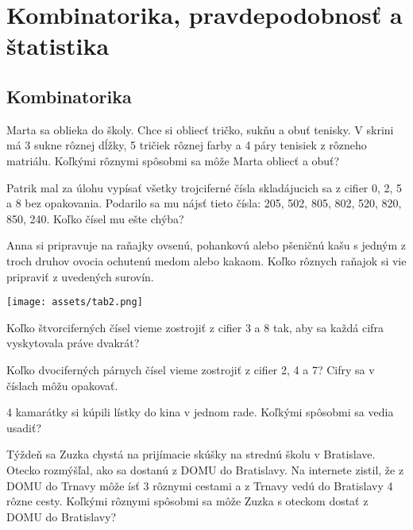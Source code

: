 \chapter{Kombinatorika, pravdepodobnosť a štatistika}

\section{Kombinatorika}

\begin{example}
	Marta sa oblieka do školy. Chce si obliecť tričko, sukňu a obuť tenisky. V skrini má 3 sukne rôznej dĺžky, 5 tričiek rôznej farby a 4 páry tenisiek z rôzneho matriálu. Koľkými rôznymi spôsobmi sa môže Marta obliecť a obuť? 
\end{example}

\begin{example}
	Patrik mal za úlohu vypísať všetky trojciferné čísla skladájucich sa z cifier 0, 2, 5 a 8 bez opakovania. Podarilo sa mu nájsť tieto čísla: 205, 502, 805, 802, 520, 820, 850, 240. Koľko čísel mu ešte chýba? 
\end{example}

\begin{example}
	Anna si pripravuje na raňajky ovsenú, pohankovú alebo pšeničnú kašu s jedným z troch druhov ovocia ochutenú medom alebo kakaom. Koľko rôznych raňajok si vie pripraviť z uvedených surovín.
	
	\begin{center}
		\texttt{[image: assets/tab2.png]}
	\end{center}
\end{example}

\begin{example}
	Koľko štvorciferných čísel vieme zostrojiť z cifier 3 a 8 tak, aby sa každá cifra vyskytovala práve dvakrát?
\end{example}

\begin{example}
	Koľko dvociferných párnych čísel vieme zostrojiť z cifier 2, 4 a 7? Cifry sa v číslach môžu opakovať.
\end{example}

\begin{example}
	4 kamarátky si kúpili lístky do kina v jednom rade. Koľkými spôsobmi sa vedia usadiť?
\end{example}

\begin{example}
	Týždeň sa Zuzka chystá na prijímacie skúšky na strednú školu v Bratislave. Otecko rozmýšľal, ako sa dostanú z DOMU do Bratislavy. Na internete zistil, že z DOMU do Trnavy môže ísť 3 rôznymi cestami a z Trnavy vedú do Bratislavy 4 rôzne cesty. Koľkými rôznymi spôsobmi sa môže Zuzka s oteckom dostať z DOMU do Bratislavy?
	
\end{example}


